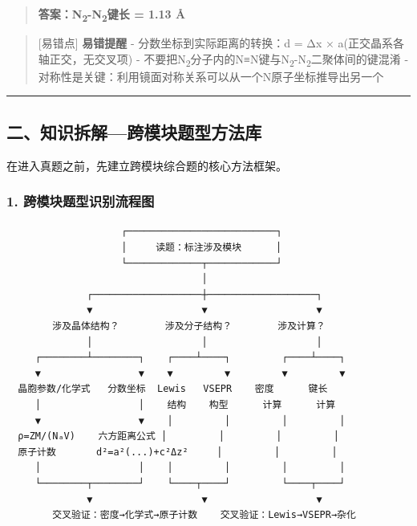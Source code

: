 \begin{quote}
\textbf{答案：N\textsubscript{2}-N\textsubscript{2}键长 = 1.13 Å}
\end{quote}

\begin{quote}
{[}易错点{]} \textbf{易错提醒}
- 分数坐标到实际距离的转换：d = Δx × a(正交晶系各轴正交，无交叉项)
- 不要把N\textsubscript{2}分子内的N≡N键与N\textsubscript{2}-N\textsubscript{2}二聚体间的键混淆
- 对称性是关键：利用镜面对称关系可以从一个N原子坐标推导出另一个
\end{quote}

\begin{center}\rule{0.5\linewidth}{0.5pt}\end{center}

\subsection{二、知识拆解---跨模块题型方法库}\label{ux4e8cux77e5ux8bc6ux62c6ux89e3ux8de8ux6a21ux5757ux9898ux578bux65b9ux6cd5ux5e93}

在进入真题之前，先建立跨模块综合题的核心方法框架。

\subsubsection{1. 跨模块题型识别流程图}\label{ux8de8ux6a21ux5757ux9898ux578bux8bc6ux522bux6d41ux7a0bux56fe}

\begin{verbatim}
                    ┌──────────────────────────┐
                    │     读题：标注涉及模块      │
                    └─────────────┬────────────┘
                                  │
              ┌───────────────────┼───────────────────┐
              ▼                   ▼                   ▼
        涉及晶体结构？        涉及分子结构？        涉及计算？
              │                   │                   │
     ┌────────┴────────┐    ┌────┴────┐         ┌────┴────┐
     ▼                 ▼    ▼         ▼         ▼         ▼
  晶胞参数/化学式   分数坐标  Lewis   VSEPR    密度      键长
     │                 │    结构    构型      计算      计算
     ▼                 ▼    │         │         │         │
  ρ=ZM/(NₐV)    六方距离公式 │         │         │         │
  原子计数       d²=a²(...)+c²Δz²     │         │         │
     │                 │    │         │         │         │
     └────────┬────────┘    └────┬────┘         └────┬────┘
              ▼                   ▼                   ▼
        交叉验证：密度→化学式→原子计数    交叉验证：Lewis→VSEPR→杂化
\end{verbatim}


